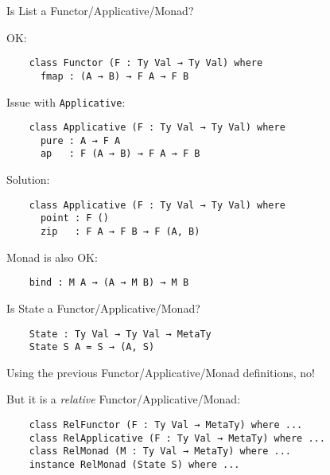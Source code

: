 \documentclass[dvipsnames,aspectratio=169]{beamer}
\theoremstyle{remark}
\begin{document}

\begin{frame}[fragile]{Is List a Functor/Applicative/Monad?}

OK:
\begin{exampleblock}{}
\begin{verbatim}
    class Functor (F : Ty Val → Ty Val) where
      fmap : (A → B) → F A → F B
\end{verbatim}
\end{exampleblock}
\pause

Issue with \texttt{Applicative}:
\begin{exampleblock}{}
\begin{verbatim}
    class Applicative (F : Ty Val → Ty Val) where
      pure : A → F A
      ap   : F (A → B) → F A → F B
\end{verbatim}
\end{exampleblock}
\pause

Solution:

\begin{exampleblock}{}
\begin{verbatim}
    class Applicative (F : Ty Val → Ty Val) where
      point : F ()
      zip   : F A → F B → F (A, B)
\end{verbatim}
\end{exampleblock}
\pause

Monad is also OK:

\begin{exampleblock}{}
\begin{verbatim}
    bind : M A → (A → M B) → M B
\end{verbatim}
\end{exampleblock}
\end{frame}

\begin{frame}[fragile]{Is State a Functor/Applicative/Monad?}

\begin{exampleblock}{}
\begin{verbatim}
    State : Ty Val → Ty Val → MetaTy
    State S A = S → (A, S)
\end{verbatim}
\end{exampleblock}
\vspace{1em}

Using the previous Functor/Applicative/Monad definitions, no!
\vspace{1em}
\pause

But it is a \emph{relative} Functor/Applicative/Monad:

\begin{exampleblock}{}
\begin{verbatim}
    class RelFunctor (F : Ty Val → MetaTy) where ...
    class RelApplicative (F : Ty Val → MetaTy) where ...
    class RelMonad (M : Ty Val → MetaTy) where ...
    instance RelMonad (State S) where ...
\end{verbatim}
\end{exampleblock}
\end{frame}
\end{document}
